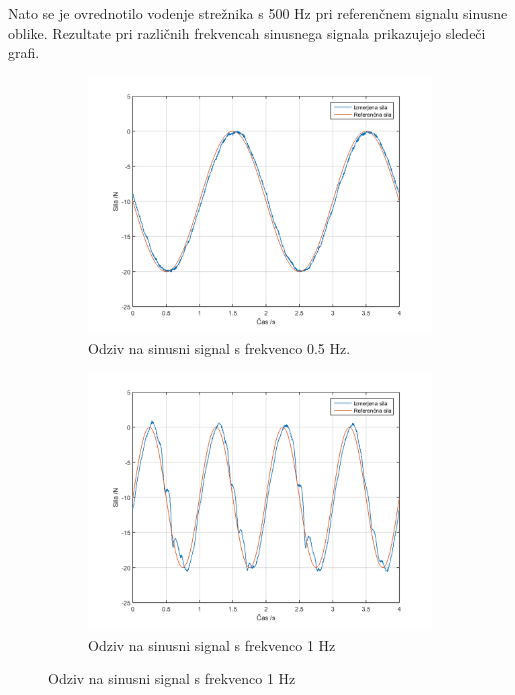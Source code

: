 \documentclass[a4paper]{article}
\begin{document}
Nato se je ovrednotilo vodenje strežnika s 500 Hz pri referenčnem signalu sinusne oblike. Rezultate pri različnih frekvencah sinusnega signala prikazujejo sledeči grafi.

\begin{figure}[!h]
	
	\begin{subfigure}[b]{0.5\textwidth}
		\includegraphics[width=\textwidth]{./slike/figure_5_hz}
		\caption{Odziv na sinusni signal s frekvenco 0.5 Hz.}
	\end{subfigure}

	\begin{subfigure}[b]{0.5\textwidth}
		\includegraphics[width=\textwidth]{./slike/figure_10_hz}
		\caption{Odziv na sinusni signal s frekvenco 1 Hz}
	\end{subfigure}
	

\end{figure}
\end{document}
